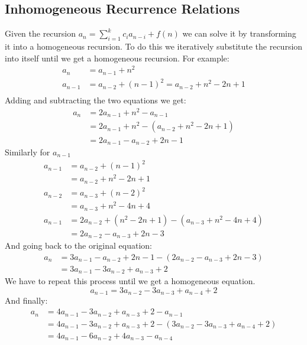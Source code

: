 \subsection{Inhomogeneous Recurrence Relations}
Given the recursion \( a_n = \sum_{i=1}^{k} c_i a_{n-i} + f(n) \) we can solve it by transforming it into a homogeneous recursion. To do this we iteratively substitute the recursion into itself until we get a homogeneous recursion. For example:
\begin{align*}
    a_n &= a_{n-1} + n^2 \\
    a_{n-1} &= a_{n-2} + \left( n - 1 \right)^2 = a_{n-2} + n^2 - 2n + 1 \\
\end{align*}
Adding and subtracting the two equations we get:
\begin{align*}
    a_n &= 2 a_{n-1} + n^2 - a_{n-1} \\
    &= 2 a_{n-1} + n^2 - \left( a_{n-2}  + n^2  - 2n + 1 \right) \\
    &= 2 a_{n-1} - a_{n-2} + 2n - 1
\end{align*}
Similarly for \( a_{n-1} \)  
\begin{align*}
    a_{n-1} &= a_{n-2} + \left( n - 1 \right)^2 \\
    &= a_{n-2} + n^2 - 2n + 1 \\
    a_{n-2} &= a_{n-3} + \left( n - 2 \right)^2 \\
    &= a_{n-3} + n^2 - 4n + 4 \\
    a_{n-1} &= 2 a_{n-2} + \left( n^2 - 2n + 1 \right) - \left( a_{n-3} + n^2 - 4n + 4 \right) \\
    &= 2 a_{n-2} - a_{n-3} + 2n - 3
\end{align*}
And going back to the original equation:
\begin{align*}
    a_n &= 3 a_{n-1} - a_{n-2} + 2n - 1 - \left( 2a_{n-2} - a_{n-3} + 2n - 3 \right) \\
    &= 3 a_{n-1} - 3 a_{n-2} + a_{n-3} + 2
\end{align*}
We have to repeat this process until we get a homogeneous equation.
\begin{equation*}
    a_{n-1} = 3 a_{n-2} - 3 a_{n-3} + a_{n-4} + 2
\end{equation*}
And finally:
\begin{align*}
    a_n &= 4 a_{n-1} - 3 a_{n-2} + a_{n-3} + 2 - a_{n-1}\\
     &= 4 a_{n-1} - 3 a_{n-2} + a_{n-3} + 2 - \left( 3 a_{n-2} - 3 a_{n-3} + a_{n-4} + 2 \right) \\
    &= 4 a_{n-1} - 6 a_{n-2} + 4 a_{n-3} - a_{n-4}
\end{align*}


